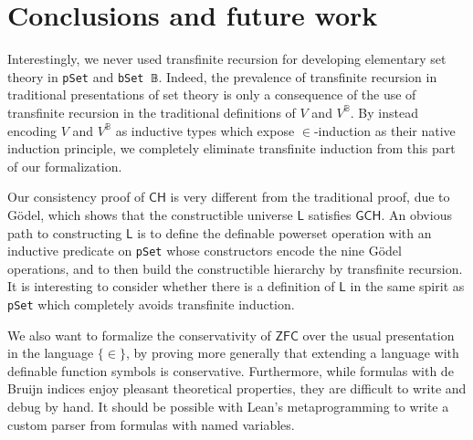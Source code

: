 \documentclass[sigplan,10pt,review]{acmart}
\newcommand{\lil}{\lstinline}
\newcommand{\CH}{\mathsf{CH}}
\theoremstyle{definition}
\begin{document}
\section{Conclusions and future work}
\label{sect:conclusions}

Interestingly, we never used transfinite recursion for developing elementary set theory in \lil{pSet} and \lil{bSet 𝔹}. Indeed, the prevalence of transfinite recursion in traditional presentations of set theory is only a consequence of the use of transfinite recursion in the traditional definitions of \(V\) and \(V^{\mathbb{B}}\). By instead encoding \(V\) and \(V^{\mathbb{B}}\) as inductive types which expose \(\in\)-induction as their native induction principle, we completely eliminate transfinite induction from this part of our formalization. %

Our consistency proof of \(\CH\) is very different from the traditional proof, due to G\"odel, which shows that the constructible universe \(\mathsf{L}\) satisfies \(\mathsf{GCH}\). An obvious path to constructing \(\mathsf{L}\) is to define the definable powerset operation with an inductive predicate on \lil{pSet} whose constructors encode the nine G\"odel operations, and to then build the constructible hierarchy by transfinite recursion. It is interesting to consider whether there is a definition of \(\mathsf{L}\) in the same spirit as \lil{pSet} which completely avoids transfinite induction.

We also want to formalize the conservativity of \(\mathsf{ZFC}\) over the usual presentation in the language \(\{\in\}\), by proving more generally that extending a language with definable function symbols is conservative.
Furthermore, while formulas with de Bruijn indices enjoy pleasant theoretical properties, they are difficult to write and debug by hand. It should be possible with Lean's metaprogramming to write a custom parser from formulas with named variables.
\end{document}
